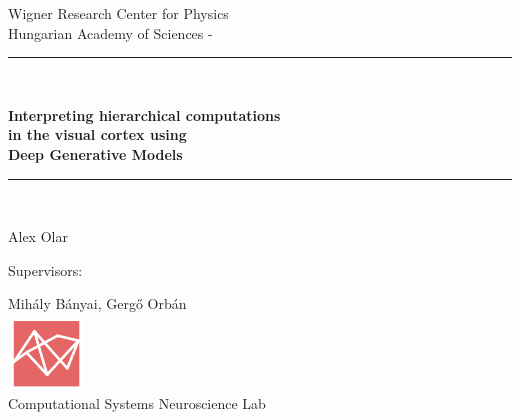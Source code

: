 \documentclass[12pt, english]{article}
\makeatletter
\newcounter{unomenos}
\gdef\@date{ \arabic{unomenos} }
\makeatother
\begin{document}
\begin{titlepage}

\begin{center}
Wigner Research Center for Physics \\ Hungarian Academy of Sciences - \@date\\
\vspace*{0.5in}
\rule{150mm}{0.1mm}\\
\vspace*{0.3in}
\begin{Large}
\textbf{Interpreting hierarchical computations \\ in the visual cortex using\\ Deep Generative Models} \\
\end{Large}
\vspace*{0.3in}
\rule{150mm}{0.1mm}\\
\vspace*{0.4in}
\begin{large}
Alex Olar \\
\end{large}
\vfill
\begin{small}
Supervisors: \\
\end{small}
\vspace{1mm}
Mihály Bányai, Gergő Orbán \\
\vspace{4mm}
\includegraphics[width=2cm]{logoFAC.png}
\vspace{2mm}
\\ Computational Systems Neuroscience Lab
\end{center}
\end{titlepage}

\newcommand{\CC}{C\nolinebreak\hspace{-.05em}\raisebox{.4ex}{\tiny\bf +}\nolinebreak\hspace{-.10em}\raisebox{.4ex}{\tiny\bf +}}
\def\CC{{C\nolinebreak[4]\hspace{-.05em}\raisebox{.4ex}{\tiny\bf ++}}}

\renewcommand{\thesection}{\Roman{section}.}
\renewcommand{\thesubsection}{\Roman{section}. \arabic{subsection}.}
\renewcommand{\thesubsubsection}{\Roman{section}. \arabic{subsection}.\arabic{subsection}.}
\end{document}
